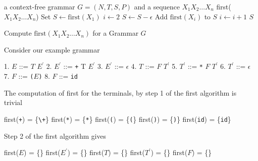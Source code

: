 \documentclass[8pt,a4paper,compress]{beamer}
\newcommand{\mm}[1]{$#1$}
\newcommand{\expo}[2]{$#1^{#2}$}
\newenvironment{spaced}
{
\smallskip
\hspace{.5cm}
\begin{minipage}[c]{\textwidth}
}
{
\end{minipage}
\smallskip
}
\begin{document}
\begin{frame}[fragile]
\pause

\begin{algorithm}[H]
\begin{algorithmic}
\REQUIRE a context-free grammar $G = (N,T,S,P)$ and a sequence $X_1X_2 \dots X_n$
\ENSURE first($X_1X_2 \dots X_n$)
\STATE Set $S \gets \text{first}(X_1)$
\STATE $i \gets 2$
\STATE $S \gets S - \epsilon$
\STATE Add $\text{first}(X_i)$ to $S$
\STATE $i \gets i + 1$
\ENDWHILE
\RETURN $S$
\end{algorithmic}
\caption{Compute $\text{first}(X_1X_2 \dots X_n)$ for a Grammar $G$}
\end{algorithm}
\end{frame}

\begin{frame}[fragile]
\pause

Consider our example grammar

\text{ }
\begin{spaced}
\begin{production}
1. \mm{E}  ::= \mm{T} \expo{E}{\prime}
2. \expo{E}{\prime} ::= \lstinline{+} T \expo{E}{\prime}
3. \expo{E}{\prime} ::= \mm{\epsilon}
4. \mm{T}  ::= \mm{F} \expo{T}{\prime}
5. \expo{T}{\prime} ::= \lstinline{*} \mm{F} \expo{T}{\prime}
6. \expo{T}{\prime} ::= \mm{\epsilon}
7. \mm{F}  ::= \lstinline{(}\mm{E}\lstinline{)}
8. \mm{F}  ::= \lstinline{id}
\end{production}
\end{spaced}

\pause
\bigskip

The computation of first for the terminals, by step 1 of the first algorithm is trivial

\text{ }
\begin{spaced}
\begin{production}
first(\lstinline{+})  = \{\lstinline{\+}\}
first(\lstinline{*})  = \{\lstinline{*}\}
first(\lstinline{(})  = \{\lstinline{(}\}
first(\lstinline{)})  = \{\lstinline{)}\}
first(\lstinline{id}) = \{\lstinline{id}\}
\end{production}
\end{spaced}

\pause
\bigskip

Step 2 of the first algorithm gives

\text{ }
\begin{spaced}
\begin{production}
first(\mm{E})  = \{\}
first(\expo{E}{\prime}) = \{\}
first(\mm{T})  = \{\}
first(\expo{T}{\prime}) = \{\}
first(\mm{F})  = \{\}
\end{production}
\end{spaced}
\end{frame}
\end{document}
